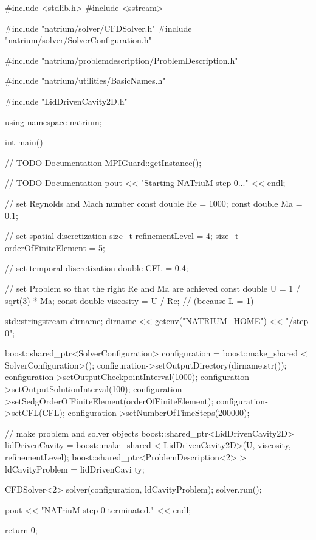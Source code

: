 \begin{DoxyCodeInclude}


#include <stdlib.h>
#include <sstream>

#include "natrium/solver/CFDSolver.h"
#include "natrium/solver/SolverConfiguration.h"

#include "natrium/problemdescription/ProblemDescription.h"

#include "natrium/utilities/BasicNames.h"

#include "LidDrivenCavity2D.h"

using namespace natrium;



int main() {
        // TODO Documentation
        MPIGuard::getInstance();

        // TODO Documentation
        pout << "Starting NATriuM step-0..." << endl;

        // set Reynolds and Mach number
        const double Re = 1000;
        const double Ma = 0.1;

        // set spatial discretization
        size_t refinementLevel = 4;
        size_t orderOfFiniteElement = 5;

        // set temporal discretization
        double CFL = 0.4;

        // set Problem so that the right Re and Ma are achieved
        const double U = 1 / sqrt(3) * Ma;
        const double viscosity = U / Re; // (because L = 1)

        std::stringstream dirname;
        dirname << getenv("NATRIUM_HOME") << "/step-0";

        boost::shared_ptr<SolverConfiguration> configuration = boost::make_shared
      <
                        SolverConfiguration>();
        configuration->setOutputDirectory(dirname.str());
        configuration->setOutputCheckpointInterval(1000);
        configuration->setOutputSolutionInterval(100);
        configuration->setSedgOrderOfFiniteElement(orderOfFiniteElement);
        configuration->setCFL(CFL);
        configuration->setNumberOfTimeSteps(200000);

        // make problem and solver objects
        boost::shared_ptr<LidDrivenCavity2D> lidDrivenCavity = boost::make_shared
      <
                        LidDrivenCavity2D>(U, viscosity, refinementLevel);
        boost::shared_ptr<ProblemDescription<2> > ldCavityProblem = lidDrivenCavi
      ty;

        CFDSolver<2> solver(configuration, ldCavityProblem);
        solver.run();

        pout << "NATriuM step-0 terminated." << endl;

        return 0;
}

\end{DoxyCodeInclude}
 